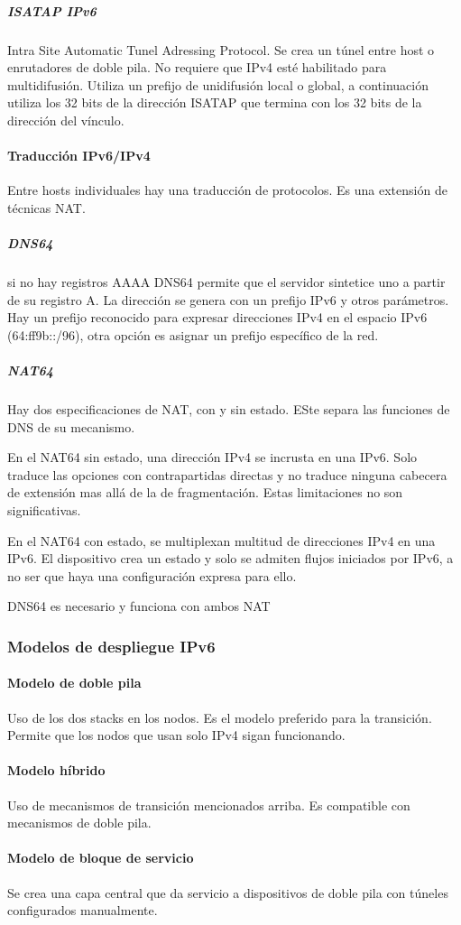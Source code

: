             \subparagraph{ISATAP IPv6} %
                Intra Site Automatic Tunel Adressing Protocol. Se crea un túnel entre host o enrutadores de doble pila. No requiere que IPv4 esté habilitado para multidifusión. Utiliza un prefijo de unidifusión local o global, a continuación utiliza los 32 bits de la dirección ISATAP que termina con los 32 bits de la dirección del vínculo.

            \paragraph{Traducción IPv6/IPv4} %
                Entre hosts individuales hay una traducción de protocolos. Es una extensión de técnicas NAT.
                \subparagraph{DNS64} %
                    si no hay registros AAAA DNS64 permite que el servidor sintetice uno a partir de su registro A. La dirección se genera con un prefijo IPv6 y otros parámetros. Hay un prefijo reconocido para expresar direcciones IPv4 en el espacio IPv6 (64:ff9b::/96), otra opción es asignar un prefijo específico de la red.

                \subparagraph{NAT64} %
                    Hay dos especificaciones de NAT, con y sin estado. ESte separa las funciones de DNS de su mecanismo.

                    En el NAT64 sin estado, una dirección IPv4 se incrusta en una IPv6. Solo traduce las opciones con contrapartidas directas y no traduce ninguna cabecera de extensión mas allá de la de fragmentación. Estas limitaciones no son significativas.

                    En el NAT64 con estado, se multiplexan multitud de direcciones IPv4 en una IPv6. El dispositivo crea un estado y solo se admiten flujos iniciados por IPv6, a no ser que haya una configuración expresa para ello.

                    DNS64 es necesario y funciona con ambos NAT

    \subsubsection{Modelos de despliegue IPv6} %
        \paragraph{Modelo de doble pila} %
            Uso de los dos stacks en los nodos. Es el modelo preferido para la transición. Permite que los nodos que usan solo IPv4 sigan funcionando.

        \paragraph{Modelo híbrido} %
            Uso de mecanismos de transición mencionados arriba. Es compatible con mecanismos de doble pila.

        \paragraph{Modelo de bloque de servicio} %
            Se crea una capa central que da servicio a dispositivos de doble pila con túneles configurados manualmente.
